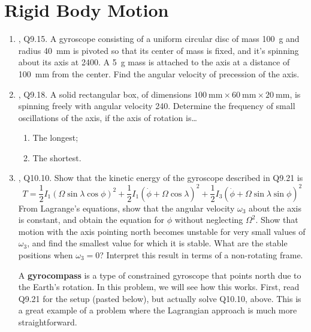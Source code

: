 \documentclass[../psets.tex]{subfiles}
\begin{document}
\section{Rigid Body Motion}
\begin{enumerate}
    \item {}\textcite{bib:KibbleBerkshire}, Q9.15. A gyroscope consisting of a uniform circular disc of mass \SI{100}{\gram} and radius \SI{40}{\milli\meter} is pivoted so that its center of mass is fixed, and it's spinning about its axis at \SI{2400}{\rpm}. A \SI{5}{\gram} mass is attached to the axis at a distance of \SI{100}{\milli\meter} from the center. Find the angular velocity of precession of the axis.
    \item \textcite{bib:KibbleBerkshire}, Q9.18. A solid rectangular box, of dimensions $\SI{100}{\milli\meter}\times\SI{60}{\milli\meter}\times\SI{20}{\milli\meter}$, is spinning freely with angular velocity \SI{240}{\rpm}. Determine the frequency of small oscillations of the axis, if the axis of rotation is\dots
    \begin{enumerate}
        \item The longest;
        \item The shortest.
    \end{enumerate}
    \item \textcite{bib:KibbleBerkshire}, Q10.10. Show that the kinetic energy of the gyroscope described in Q9.21 is
    \begin{equation*}
        T = \frac{1}{2}I_1(\Omega\sin\lambda\cos\phi)^2+\frac{1}{2}I_1(\dot{\phi}+\Omega\cos\lambda)^2+\frac{1}{2}I_3(\dot{\phi}+\Omega\sin\lambda\sin\phi)^2
    \end{equation*}
    From Lagrange's equations, show that the angular velocity $\omega_3$ about the axis is constant, and obtain the equation for $\phi$ without neglecting $\Omega^2$. Show that motion with the axis pointing north becomes unstable for very small values of $\omega_3$, and find the smallest value for which it is stable. What are the stable positions when $\omega_3=0$? Interpret this result in terms of a non-rotating frame.\par
    A \textbf{gyrocompass} is a type of constrained gyroscope that points north due to the Earth's rotation. In this problem, we will see how this works. First, read Q9.21 for the setup (pasted below), but actually solve Q10.10, above. This is a great example of a problem where the Lagrangian approach is much more straightforward.\par

\end{enumerate}
\end{document}
